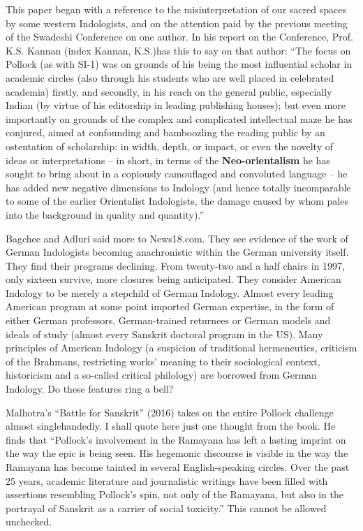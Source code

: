 \item This paper began with a reference to the misinterpretation of our sacred spaces by some western Indologists, and on the attention paid by the previous meeting of the Swadeshi Conference on one author. In his report on the Conference, Prof. K.S. Kannan (index Kannan, K.S.)has this to say on that author: “The focus on Pollock (as with SI-1) was on grounds of his being the most influential scholar in academic circles (also through his students who are well placed in celebrated academia) firstly, and secondly, in his reach on the general public, especially Indian (by virtue of his editorship in leading publishing houses); but even more importantly on grounds of the complex and complicated intellectual maze he has conjured, aimed at confounding and bamboozling the reading public by an ostentation of scholarship: in width, depth, or impact, or even the novelty of ideas or interpretations – in short, in terms of the \textbf{Neo-orientalism} he has sought to bring about in a copiously camouflaged and convoluted language – he has added new negative dimensions to Indology (and hence totally incomparable to some of the earlier Orientalist Indologists, the damage caused by whom pales into the background in quality and quantity).”

 \item Bagchee and Adluri said more to News18.com. They see evidence of the work of German Indologists becoming anachronistic within the German university itself. They find their programs declining. From twenty-two and a half chairs in 1997, only sixteen survive, more closures being anticipated. They consider American Indology to be merely a stepchild of German Indology. Almost every leading American program at some point imported German expertise, in the form of either German professors, German-trained returnees or German models and ideals of study (almost every Sanskrit doctoral program in the US). Many principles of American Indology (a suspicion of traditional hermeneutics, criticism of the Brahmans, restricting works’ meaning to their sociological context, historicism and a so-called critical philology) are borrowed from German Indology. Do these features ring a bell?

 \item Malhotra’s “Battle for Sanskrit” (2016) takes on the entire Pollock challenge almost singlehandedly. I shall quote here just one thought from the book. He finds that “Pollock’s involvement in the Ramayana has left a lasting imprint on the way the epic is being seen. His hegemonic discourse is visible in the way the Ramayana has become tainted in several English-speaking circles. Over the past 25 years, academic literature and journalistic writings have been filled with assertions resembling Pollock’s spin, not only of the Ramayana, but also in the portrayal of Sanskrit as a carrier of social toxicity.” This cannot be allowed unchecked.


